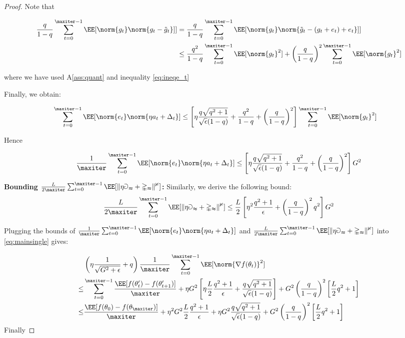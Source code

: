 \documentclass[11pt]{article}
\begin{document}
\begin{proof}
Note that

\begin{align*}
\frac{q}{1-q} \sum_{t=0}^{\maxiter -1}\EE[\norm{g_{t}} \norm{g_t - \tilde g_t}]] &= \frac{q}{1-q} \sum_{t=0}^{\maxiter -1}\EE[\norm{g_{t}} \norm{\tilde g_t - (g_t+e_t) +e_t}]]\\
&\leq \frac{q^2}{1-q} \sum_{t=0}^{\maxiter -1}\EE[\norm{g_{t}}^2] + \left(\frac{q}{1-q}\right)^2 \sum_{t=0}^{\maxiter -1}\EE[\norm{g_{t}}^2]
\end{align*}

where we have used A\ref{ass:quant} and inequality \eqref{eq:ineqe_t}


Finally, we obtain:

\begin{align*}
\sum_{t=0}^{\maxiter -1}  \EE[\norm{e_t}\norm{\eta a_t + \Delta_t}] & \leq 
\left[ \eta \frac{q\sqrt{q^2+1}}{\sqrt{\epsilon}(1-q)} + \frac{q^2}{1-q} + \left(\frac{q}{1-q}\right)^2 \right]\sum_{t=0}^{\maxiter -1} \EE[\norm{g_{t}}^2]
\end{align*}

Hence

\begin{align*}
\frac{1}{\maxiter}\sum_{t=0}^{\maxiter -1}  \EE[\norm{e_t}\norm{\eta a_t + \Delta_t}] \leq \left[ \eta \frac{q\sqrt{q^2+1}}{\sqrt{\epsilon}(1-q)} + \frac{q^2}{1-q} + \left(\frac{q}{1-q}\right)^2 \right] G^2
\end{align*}


\textbf{Bounding $\frac{L}{2\maxiter}\sum_{t=0}^{\maxiter -1} \mathbb \EE[\|\eta a_t + \Delta_t\|^2]$:}
Similarly, we derive the following bound:
\begin{align*}
\frac{L}{2\maxiter}\sum_{t=0}^{\maxiter -1} \mathbb \EE[\|\eta a_t + \Delta_t\|^2] \leq \frac{L}{2} \left[ \eta^2 \frac{q^2 +1}{\epsilon} + \left(\frac{q}{1-q}\right)^2 q^2 \right] G^2
\end{align*}



Plugging the bounds of $\frac{1}{\maxiter}\sum_{t=0}^{\maxiter -1}  \EE[\norm{e_t}\norm{\eta a_t + \Delta_t}]$ and $\frac{L}{2\maxiter}\sum_{t=0}^{\maxiter -1} \mathbb \EE[\|\eta a_t + \Delta_t\|^2]$ into \eqref{eq:mainsingle} gives:

\begin{equation}\label{eq:mainsinglefinal}
\begin{split}
&  \left( \eta\frac{1}{\sqrt{G^2+\epsilon}} + q \right) \frac{1}{\maxiter}\sum_{t=0}^{\maxiter -1} \EE[\norm{\nabla f(\theta_t)}^2]  \\
\leq &\sum_{t=0}^{\maxiter -1}\frac{\EE[f(\theta_t') -f(\theta_{t+1}')]}{\maxiter}  + \eta G^2 \left[ \eta \frac{L}{2} \frac{q^2+1}{\epsilon} + \frac{q\sqrt{q^2+1}}{\sqrt{\epsilon}(1-q)} \right] +  G^2 \left(\frac{q}{1-q}\right)^2 \left[ \frac{L}{2}q^2 + 1 \right]\\
\leq &\frac{\EE[f(\theta_{0}) - f(\theta_{\maxiter})]}{\maxiter}  + \eta^2 G^2\frac{L}{2} \frac{q^2+1}{\epsilon} + \eta G^2 \frac{q\sqrt{q^2+1}}{\sqrt{\epsilon}(1-q)}  +  G^2 \left(\frac{q}{1-q}\right)^2 \left[ \frac{L}{2}q^2 + 1 \right]
\end{split}
\end{equation}
 Finally
 

\end{proof}
\end{document}
